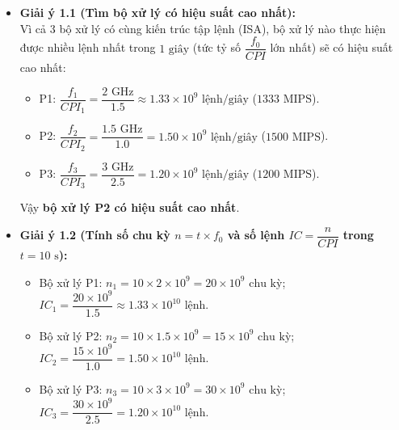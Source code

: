 \begin{itemize}
    \item \textbf{Giải ý 1.1 (Tìm bộ xử lý có hiệu suất cao nhất):}\\
    Vì cả 3 bộ xử lý có cùng kiến trúc tập lệnh (ISA), bộ xử lý nào thực hiện được nhiều lệnh nhất trong $1\text{ giây}$ (tức tỷ số $\dfrac{f_0}{CPI}$ lớn nhất) sẽ có hiệu suất cao nhất:
    \begin{itemize}
        \item P1: $\dfrac{f_1}{CPI_1} = \dfrac{2\text{ GHz}}{1.5} \approx 1.33 \times 10^9\text{ lệnh/giây}$ ($1333\text{ MIPS}$).
        \item P2: $\dfrac{f_2}{CPI_2} = \dfrac{1.5\text{ GHz}}{1.0} = 1.50 \times 10^9\text{ lệnh/giây}$ ($1500\text{ MIPS}$).
        \item P3: $\dfrac{f_3}{CPI_3} = \dfrac{3\text{ GHz}}{2.5} = 1.20 \times 10^9\text{ lệnh/giây}$ ($1200\text{ MIPS}$).
    \end{itemize}
    Vậy \textbf{bộ xử lý P2 có hiệu suất cao nhất}.

    \item \textbf{Giải ý 1.2 (Tính số chu kỳ $n = t \times f_0$ và số lệnh $IC = \dfrac{n}{CPI}$ trong $t = 10\text{ s}$):}
    \begin{itemize}
        \item Bộ xử lý P1: $n_1 = 10 \times 2 \times 10^9 = 20 \times 10^9\text{ chu kỳ}$; \quad $IC_1 = \dfrac{20 \times 10^9}{1.5} \approx 1.33 \times 10^{10}\text{ lệnh}$.
        \item Bộ xử lý P2: $n_2 = 10 \times 1.5 \times 10^9 = 15 \times 10^9\text{ chu kỳ}$; \quad $IC_2 = \dfrac{15 \times 10^9}{1.0} = 1.50 \times 10^{10}\text{ lệnh}$.
        \item Bộ xử lý P3: $n_3 = 10 \times 3 \times 10^9 = 30 \times 10^9\text{ chu kỳ}$; \quad $IC_3 = \dfrac{30 \times 10^9}{2.5} = 1.20 \times 10^{10}\text{ lệnh}$.
    \end{itemize}


\end{itemize}
